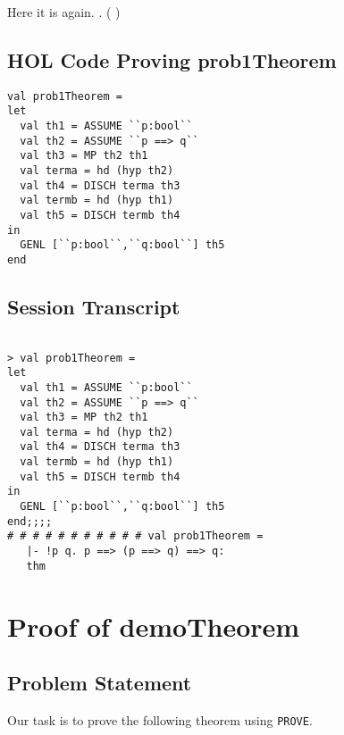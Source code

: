 \documentclass{report}
\begin{document}
Here it is again. \HOLTokenTurnstile{} \HOLSymConst{\HOLTokenForall{}} .  \HOLSymConst{\HOLTokenImp{}} ( \HOLSymConst{\HOLTokenImp{}} ) \HOLSymConst{\HOLTokenImp{}} 
\section{HOL Code Proving prob1Theorem}
\label{sec:hol-code-proving}


\begin{lstlisting}[frame=trBL]
val prob1Theorem =
let
  val th1 = ASSUME ``p:bool``
  val th2 = ASSUME ``p ==> q``
  val th3 = MP th2 th1
  val terma = hd (hyp th2)
  val th4 = DISCH terma th3
  val termb = hd (hyp th1)
  val th5 = DISCH termb th4
in
  GENL [``p:bool``,``q:bool``] th5
end  
\end{lstlisting}

\section{Session Transcript}
\label{sec:session-transcript}

\setcounter{sessioncount}{0}
\begin{session}
  \begin{scriptsize}
\begin{verbatim}

> val prob1Theorem =
let
  val th1 = ASSUME ``p:bool``
  val th2 = ASSUME ``p ==> q``
  val th3 = MP th2 th1
  val terma = hd (hyp th2)
  val th4 = DISCH terma th3
  val termb = hd (hyp th1)
  val th5 = DISCH termb th4
in
  GENL [``p:bool``,``q:bool``] th5
end;;;;
# # # # # # # # # # # val prob1Theorem =
   |- !p q. p ==> (p ==> q) ==> q:
   thm
\end{verbatim}
  \end{scriptsize}
\end{session}

\chapter{Proof of demoTheorem}
\label{cha:proof-demotheorem}

\section{Problem Statement}
\label{sec:problem-statement-1}

Our task is to prove the following theorem using \texttt{PROVE}.
\HOLexampleOneTheoremsdemoTheorem
\end{document}
